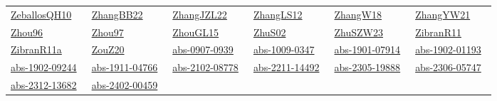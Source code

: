 \begin{longtable}{*{6}{l}}
\href{../works/ZeballosQH10.pdf}{ZeballosQH10}~\cite{ZeballosQH10} & \href{../works/ZhangBB22.pdf}{ZhangBB22}~\cite{ZhangBB22} & \href{../works/ZhangJZL22.pdf}{ZhangJZL22}~\cite{ZhangJZL22} & \href{../works/ZhangLS12.pdf}{ZhangLS12}~\cite{ZhangLS12} & \href{../works/ZhangW18.pdf}{ZhangW18}~\cite{ZhangW18} & \href{../works/ZhangYW21.pdf}{ZhangYW21}~\cite{ZhangYW21}\\ 
\href{../works/Zhou96.pdf}{Zhou96}~\cite{Zhou96} & \href{../works/Zhou97.pdf}{Zhou97}~\cite{Zhou97} & \href{../works/ZhouGL15.pdf}{ZhouGL15}~\cite{ZhouGL15} & \href{../works/ZhuS02.pdf}{ZhuS02}~\cite{ZhuS02} & \href{../works/ZhuSZW23.pdf}{ZhuSZW23}~\cite{ZhuSZW23} & \href{../works/ZibranR11.pdf}{ZibranR11}~\cite{ZibranR11}\\ 
\href{../works/ZibranR11a.pdf}{ZibranR11a}~\cite{ZibranR11a} & \href{../works/ZouZ20.pdf}{ZouZ20}~\cite{ZouZ20} & \href{../works/abs-0907-0939.pdf}{abs-0907-0939}~\cite{abs-0907-0939} & \href{../works/abs-1009-0347.pdf}{abs-1009-0347}~\cite{abs-1009-0347} & \href{../works/abs-1901-07914.pdf}{abs-1901-07914}~\cite{abs-1901-07914} & \href{../works/abs-1902-01193.pdf}{abs-1902-01193}~\cite{abs-1902-01193}\\ 
\href{../works/abs-1902-09244.pdf}{abs-1902-09244}~\cite{abs-1902-09244} & \href{../works/abs-1911-04766.pdf}{abs-1911-04766}~\cite{abs-1911-04766} & \href{../works/abs-2102-08778.pdf}{abs-2102-08778}~\cite{abs-2102-08778} & \href{../works/abs-2211-14492.pdf}{abs-2211-14492}~\cite{abs-2211-14492} & \href{../works/abs-2305-19888.pdf}{abs-2305-19888}~\cite{abs-2305-19888} & \href{../works/abs-2306-05747.pdf}{abs-2306-05747}~\cite{abs-2306-05747}\\ 
\href{../works/abs-2312-13682.pdf}{abs-2312-13682}~\cite{abs-2312-13682} & \href{../works/abs-2402-00459.pdf}{abs-2402-00459}~\cite{abs-2402-00459} & \end{longtable}
